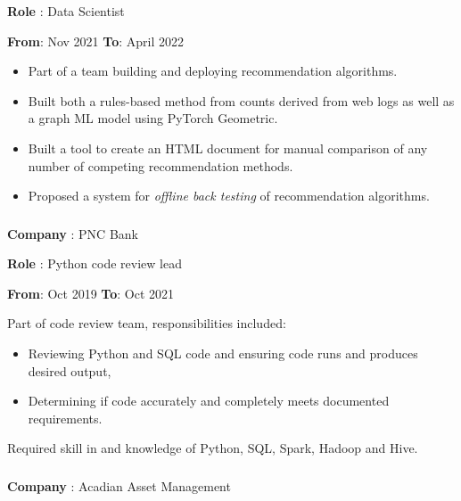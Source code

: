 \documentclass[
]{article}
\providecommand{\tightlist}{%
  \setlength{\itemsep}{0pt}\setlength{\parskip}{0pt}}
\begin{document}
\begin{flushleft}
\textbf{Role} : Data Scientist
\end{flushleft}
{\textbf{From}: Nov 2021 \hspace{0.5in}  \textbf{To}: April 2022}
\begin{itemize}
\tightlist
\item
  Part of a team building and deploying recommendation algorithms.
\item
  Built both a rules-based method from counts derived from web logs as
  well as a graph ML model using PyTorch Geometric.
\item
  Built a tool to create an HTML document for manual comparison of any
  number of competing recommendation methods.
\item
  Proposed a system for \emph{offline back testing} of recommendation
  algorithms.
\end{itemize}


\hypertarget{pnc}{\subsubsection{}\label{pnc}}
\begin{flushleft}
\textbf{Company} : PNC Bank
\end{flushleft}

\begin{flushleft}
\textbf{Role} : Python code review lead
\end{flushleft}

\textbf{From}: Oct 2019 \hspace{0.5in} \textbf{To}: Oct 2021

Part of code review team, responsibilities included:

\begin{itemize}
\tightlist
\item
  Reviewing Python and SQL code and ensuring code runs and produces
  desired output,
\item
  Determining if code accurately and completely meets documented
  requirements.
\end{itemize}
Required skill in and knowledge of Python, SQL, Spark, Hadoop and Hive.


\hypertarget{acadian}{\subsubsection{}\label{acadian}}
\begin{flushleft}
\textbf{Company} : Acadian Asset Management
\end{flushleft}
\end{document}
